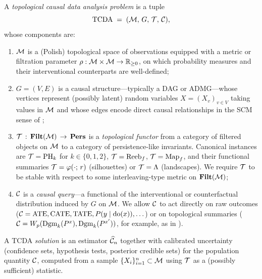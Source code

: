 \begin{definition}\label{def:tcda}
A \emph{topological causal data analysis problem} is a tuple
\[
\mathrm{TCDA} \;=\; (\mathcal{M},\, G,\, \mathcal{T},\, \mathcal{C}),
\]
whose components are:
\begin{enumerate}[leftmargin=2em,label=(\roman*)]
\item $\mathcal{M}$ is a (Polish) topological space of observations equipped with
a metric or filtration parameter $\rho:\mathcal{M}\times\mathcal{M}\to\mathbb{R}_{\geq 0}$, on which
probability measures and their interventional counterparts are well-defined;
\item $G = (V,E)$ is a causal structure---typically a DAG or ADMG---whose
vertices represent (possibly latent) random variables $X = (X_v)_{v\in V}$
taking values in $\mathcal{M}$ and whose edges encode direct causal relationships
in the SCM sense of ;
\item $\mathcal{T} \,:\, \mathbf{Filt}(\mathcal{M}) \,\to\, \mathbf{Pers}$ is a
\emph{topological functor} from a category of filtered objects on $\mathcal{M}$
to a category of persistence-like invariants. Canonical instances are
$\mathcal{T} = \mathrm{PH}_{k}$ for $k\in\{0,1,2\}$, $\mathcal{T} = \mathrm{Reeb}_f$, $\mathcal{T} = \mathrm{Map}_f$,
and their functional summaries $\mathcal{T} = \varphi(\cdot;\,r)$ (silhouettes)
or $\mathcal{T} = \Lambda$ (landscapes). We require $\mathcal{T}$ to be stable with
respect to some interleaving-type metric on $\mathbf{Filt}(\mathcal{M})$;
\item $\mathcal{C}$ is a \emph{causal query}---a functional of the
interventional or counterfactual distribution induced by $G$ on $\mathcal{M}$.
We allow $\mathcal{C}$ to act directly on raw outcomes ($\mathcal{C} = \operatorname{ATE},\operatorname{CATE},\operatorname{TATE},
P(y\mid \mathrm{do}(x)),\ldots$) or on topological summaries
($\mathcal{C} = W_p(\mathrm{Dgm}_{k}(P^{x}),\mathrm{Dgm}_{k}(P^{x'}))$, for example, as in
\citet{kim2026topological}).
\end{enumerate}
A TCDA \emph{solution} is an estimator $\widehat{\mathcal{C}}_n$ together with
calibrated uncertainty (confidence sets, hypothesis tests, posterior
credible sets) for the population quantity $\mathcal{C}$, computed from a sample
$\{X_i\}_{i=1}^n \subset \mathcal{M}$ using $\mathcal{T}$ as a (possibly sufficient)
statistic.
\end{definition}

